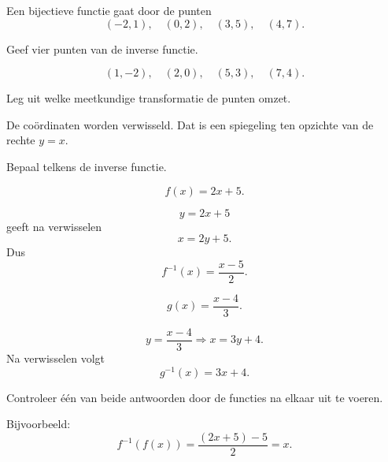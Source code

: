 \documentclass{ximera}
\begin{document}
\begin{oefening}{\oefB\ESS}

Een bijectieve functie gaat door de punten
\[
(-2,1),\quad(0,2),\quad(3,5),\quad(4,7).
\]

\begin{question}
Geef vier punten van de inverse functie.

\begin{oplossing}
\[
(1,-2),\quad(2,0),\quad(5,3),\quad(7,4).
\]
\end{oplossing}
\end{question}

\begin{question}
Leg uit welke meetkundige transformatie de punten omzet.

\begin{oplossing}
De coördinaten worden verwisseld. Dat is een spiegeling ten opzichte van
de rechte \(y=x\).
\end{oplossing}
\end{question}

\end{oefening}

\begin{oefening}{\oefB\ESS}

Bepaal telkens de inverse functie.

\begin{question}
\[
f(x)=2x+5.
\]

\begin{oplossing}
\[
y=2x+5
\]
geeft na verwisselen
\[
x=2y+5.
\]
Dus
\[
\boxed{f^{-1}(x)=\frac{x-5}{2}.}
\]
\end{oplossing}
\end{question}

\begin{question}
\[
g(x)=\frac{x-4}{3}.
\]

\begin{oplossing}
\[
y=\frac{x-4}{3}
\Longrightarrow
x=3y+4.
\]
Na verwisselen volgt
\[
\boxed{g^{-1}(x)=3x+4.}
\]
\end{oplossing}
\end{question}

\begin{question}
Controleer één van beide antwoorden door de functies na elkaar uit te voeren.

\begin{oplossing}
Bijvoorbeeld:
\[
f^{-1}(f(x))
=
\frac{(2x+5)-5}{2}
=x.
\]
\end{oplossing}
\end{question}

\end{oefening}
\end{document}
